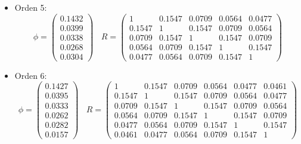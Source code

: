 \begin{itemize}
\item Orden 5:
\begin{equation*}
	\phi = 
	\begin{pmatrix}
		0.1432 \\
		0.0399 \\
		0.0338 \\
		0.0268 \\
		0.0304  
	\end{pmatrix}	\	\	\	\
	R =
	\begin{pmatrix}
		1 & 0.1547 & 0.0709 & 0.0564 & 0.0477 \\
    	0.1547 & 1 & 0.1547 & 0.0709 & 0.0564 \\
    	0.0709 & 0.1547 & 1 & 0.1547 & 0.0709 \\
    	0.0564 & 0.0709 & 0.1547 & 1 & 0.1547 \\
    	0.0477 & 0.0564 & 0.0709 & 0.1547 & 1	  
	\end{pmatrix}
\end{equation*}

\item Orden 6:
\begin{equation*}
	\phi = 
	\begin{pmatrix}
		0.1427 \\
		0.0395 \\
		0.0333 \\
		0.0262 \\
		0.0282 \\
		0.0157  
	\end{pmatrix}	\	\	\	\
	R =
	\begin{pmatrix}
		1 & 0.1547 & 0.0709 & 0.0564 & 0.0477 & 0.0461 \\
		0.1547 & 1 & 0.1547 & 0.0709 & 0.0564 & 0.0477 \\
		0.0709 & 0.1547 & 1 & 0.1547 & 0.0709 & 0.0564 \\
		0.0564 & 0.0709 & 0.1547 & 1 & 0.1547 & 0.0709 \\
		0.0477 & 0.0564 & 0.0709 & 0.1547 & 1 & 0.1547 \\
		0.0461 & 0.0477 & 0.0564 & 0.0709 & 0.1547 & 1	
	\end{pmatrix}
\end{equation*}


\end{itemize}
